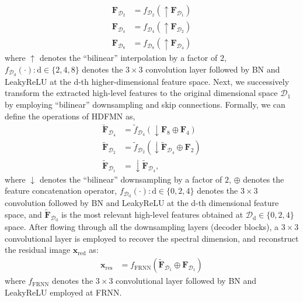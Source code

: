 \documentclass[journal]{IEEEtran}
\begin{document}
    \begin{align}
        \mathbf{F}_{\mathcal{D}_2} &= f_{\mathcal{D}_2} (\uparrow \mathbf{F}_{\mathcal{D}_1})\\
        \mathbf{F}_{\mathcal{D}_4} &= f_{\mathcal{D}_4} (\uparrow \mathbf{F}_{\mathcal{D}_2})\\
        \mathbf{F}_{\mathcal{D}_8} &= f_{\mathcal{D}_8} (\uparrow \mathbf{F}_{\mathcal{D}_4})
    \end{align}
    where $\uparrow$ denotes the ``bilinear'' interpolation by a factor of $2$, $f_{\mathcal{D}_{\text{d}}}(\cdot): \text{d} \in \{2,4,8\}$ denotes the $3 \times 3$ convolution layer followed by BN and LeakyReLU at the d-th higher-dimensional feature space. Next, we successively transform the extracted high-level features to the original dimensional space $\mathcal{D}_1$ by employing ``bilinear'' downsampling and skip connections. Formally, we can define the operations of HDFMN as,
    \begin{align}
        \widetilde{\mathbf{F}}_{\mathcal{D}_4} &= \widetilde{f}_{\mathcal{D}_4} (\downarrow \mathbf{F}_8 \oplus \mathbf{F}_4)\\
        \widetilde{\mathbf{F}}_{\mathcal{D}_2} &= \widetilde{f}_{\mathcal{D}_2} (\downarrow \widetilde{\mathbf{F}}_{\mathcal{D}_4} \oplus \mathbf{F}_2) \\
        \widetilde{\mathbf{F}}_{\mathcal{D}_1} &= \downarrow \widetilde{\mathbf{F}}_{\mathcal{D}_4},
    \end{align}
    where $\downarrow$ denotes the ``bilinear'' downsampling by a factor of $2$, $\oplus$ denotes the feature concatenation operator, $f_{\mathcal{D}_{\text{d}}}(\cdot): \text{d} \in \{0, 2, 4\}$ denotes the $3 \times 3$ convolution followed by BN and LeakyReLU at the d-th dimensional feature space, and $\widetilde{\mathbf{F}}_{\mathcal{D}_{\text{d}}}$ is the most relevant high-level features obtained at $\mathcal{D}_{\text{d}} \in \{0, 2, 4\}$ space. After flowing through all the downsampling layers (decoder blocks), a $3 \times 3$ convolutional layer is employed to recover the spectral dimension, and reconstruct the residual image $\mathbf{x}_{\text{red}}$ as:
    \begin{align}
        \mathbf{x}_{\text{res}} &= f_{\text{FRNN}} (\widetilde{\mathbf{F}}_{\mathcal{D}_1} \oplus \mathbf{F}_{\mathcal{D}_1})
    \end{align}
    where $f_{\text{FRNN}}$  denotes the $3 \times 3$ convolutional layer followed by BN and LeakyReLU employed at FRNN. 
    
\end{document}
